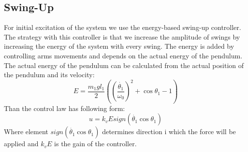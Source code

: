 \subsection{Swing-Up}
For initial excitation of the system we use the energy-based swing-up controller. The strategy with this controller is that we increase the amplitude of swings by increasing the energy of the system with every swing. The energy is added by controlling arms movements and depends on the actual energy of the pendulum. The actual energy of the pendulum can be calculated from the actual position of the pendulum and its velocity: 
\begin{equation}
E = \frac{m_1gl_1}{2}((\frac{\dot{\theta_1}}{\omega_0})^2+\cos\theta_1 - 1)
\end{equation}
Than the control law has following form:
\begin{equation}
	u = k_vEsign(\dot{\theta_1}\cos\theta_1)
\end{equation}
Where element $sign(\dot{\theta_1}\cos\theta_1)$ determines direction i which the force will be applied and $k_vE$ is the gain of the controller.







